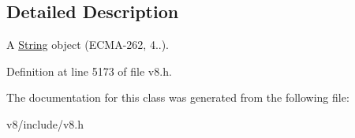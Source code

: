 \subsection{Detailed Description}
A \mbox{\hyperlink{classv8_1_1String}{String}} object (E\+C\+M\+A-\/262, 4..). 

Definition at line 5173 of file v8.\+h.



The documentation for this class was generated from the following file\+:\begin{DoxyCompactItemize}
\item 
v8/include/v8.\+h\end{DoxyCompactItemize}

